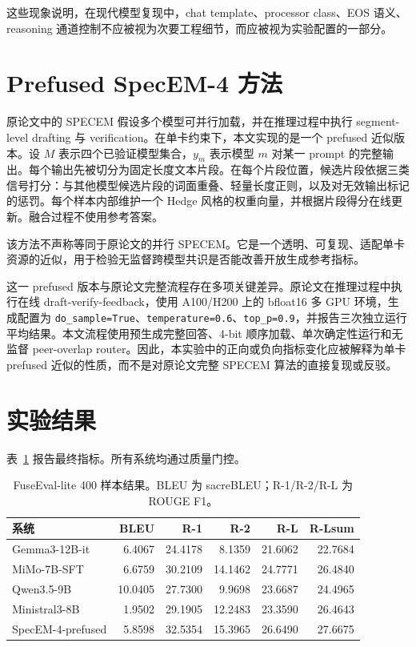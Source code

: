 \documentclass[11pt]{ctexart}
\begin{document}
这些现象说明，在现代模型复现中，chat template、processor class、EOS 语义、reasoning 通道控制不应被视为次要工程细节，而应被视为实验配置的一部分。

\section{Prefused SpecEM-4 方法}
原论文中的 SPECEM 假设多个模型可并行加载，并在推理过程中执行 segment-level drafting 与 verification。在单卡约束下，本文实现的是一个 prefused 近似版本。设 $M$ 表示四个已验证模型集合，$y_m$ 表示模型 $m$ 对某一 prompt 的完整输出。每个输出先被切分为固定长度文本片段。在每个片段位置，候选片段依据三类信号打分：与其他模型候选片段的词面重叠、轻量长度正则，以及对无效输出标记的惩罚。每个样本内部维护一个 Hedge 风格的权重向量，并根据片段得分在线更新。融合过程不使用参考答案。

该方法不声称等同于原论文的并行 SPECEM。它是一个透明、可复现、适配单卡资源的近似，用于检验无监督跨模型共识是否能改善开放生成参考指标。

这一 prefused 版本与原论文完整流程存在多项关键差异。原论文在推理过程中执行在线 draft-verify-feedback，使用 A100/H200 上的 bfloat16 多 GPU 环境，生成配置为 \texttt{do\_sample=True}、\texttt{temperature=0.6}、\texttt{top\_p=0.9}，并报告三次独立运行平均结果。本文流程使用预生成完整回答、4-bit 顺序加载、单次确定性运行和无监督 peer-overlap router。因此，本实验中的正向或负向指标变化应被解释为单卡 prefused 近似的性质，而不是对原论文完整 SPECEM 算法的直接复现或反驳。

\section{实验结果}
表~\ref{tab:results} 报告最终指标。所有系统均通过质量门控。

\begin{table}[h]
\centering
\begin{tabular}{lrrrrr}
\toprule
系统 & BLEU & R-1 & R-2 & R-L & R-Lsum \\
\midrule
Gemma3-12B-it & 6.4067 & 24.4178 & 8.1359 & 21.6062 & 22.7684 \\
MiMo-7B-SFT & 6.6759 & 30.2109 & 14.1462 & 24.7771 & 26.4840 \\
Qwen3.5-9B & 10.0405 & 27.7300 & 9.9698 & 23.6687 & 24.4965 \\
Ministral3-8B & 1.9502 & 29.1905 & 12.2483 & 23.3590 & 26.4643 \\
SpecEM-4-prefused & 5.8598 & 32.5354 & 15.3965 & 26.6490 & 27.6675 \\
\bottomrule
\end{tabular}
\caption{FuseEval-lite 400 样本结果。BLEU 为 sacreBLEU；R-1/R-2/R-L 为 ROUGE F1。}
\label{tab:results}
\end{table}
\end{document}
